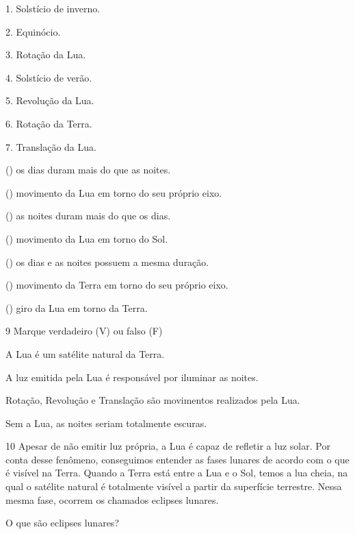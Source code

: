 {\setlength{\columnsep}{-5cm}
\begin{multicols}{1}
1. Solstício de inverno.

2. Equinócio.

3. Rotação da Lua.

4. Solstício de verão.

5. Revolução da Lua.

6. Rotação da Terra.

7. Translação da Lua.

\columnbreak

({}) os dias duram mais do que as noites.

({}) movimento da Lua em torno do seu próprio eixo.

({}) as noites duram mais do que os dias.

({}) movimento da Lua em torno do Sol.

({}) os dias e as noites possuem a mesma duração.

({}) movimento da Terra em torno do seu próprio eixo.

({}) giro da Lua em torno da Terra.
\end{multicols}
}

\num{9} Marque verdadeiro (V) ou falso (F)

\begin{boxlist}
 A Lua é um satélite natural da Terra.

 A luz emitida pela Lua é responsável por iluminar as noites.

 Rotação, Revolução e Translação são movimentos realizados pela Lua.

 Sem a Lua, as noites seriam totalmente escuras.
\end{boxlist}


\num{10} Apesar de não emitir luz própria, a Lua é capaz de
refletir a luz solar. Por conta desse fenômeno, conseguimos entender as
fases lunares de acordo com o que é visível na Terra. Quando a Terra está
entre a Lua e o Sol, temos a lua cheia, na qual o satélite natural é
totalmente visível a partir da superfície terrestre. Nessa mesma fase,
ocorrem os chamados eclipses lunares.

O que são eclipses lunares?

